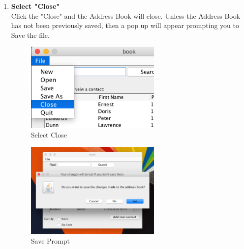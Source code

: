 \documentclass[a4paper, 11pt]{article}
\begin{document}
\begin{enumerate}[label=\textbf{\arabic*})]
    \clearpage
    
    \item{\textbf{Select "Close"}}\\ Click the "Close" and the Address Book will close. Unless the Address Book has not been previously saved, then a pop up will appear prompting you to Save the file.
    
    \begin{figure}[h!]
    \centering
      \includegraphics[width=250]{close_selection.png}
      \caption{Select Close}
    \end{figure}
    
    \begin{figure}[h!]
    \centering
      \includegraphics[width=250]{close_save_error.png}
      \caption{Save Prompt}
    \end{figure} 
\end{enumerate}
\end{document}
